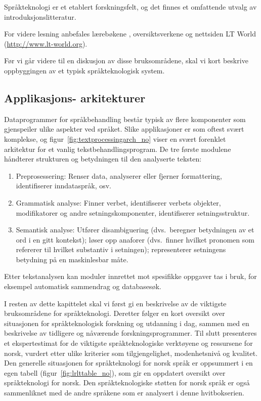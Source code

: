 \begin{multicols}{2}
Språkteknologi er et etablert forskningsfelt, og det finnes et omfattende utvalg av introduksjonslitteratur.

For videre lesning anbefales lærebøkene \cite{jurafsky-martin01, manning-schuetze1}, oversiktsverkene \cite{lt-survey1} og nettsiden LT World (\url{http://www.lt-world.org}).

Før vi går videre til en diskusjon av disse bruksområdene, skal vi kort beskrive oppbyggingen av et typisk språkteknologisk system.

\subsection[Applikasjonsarkitekturer]{Applikasjons- arkitekturer}

Dataprogrammer for språkbehandling består typisk av flere komponenter som gjenspeiler ulike aspekter ved språket. Slike applikasjoner er som oftest svært komplekse, og figur~\ref{fig:textprocessingarch_no} viser en svært forenklet arkitektur for et vanlig tekstbehandlingsprogram. De tre første modulene håndterer strukturen og betydningen til den analyserte teksten:

\begin{enumerate}
\item Preprosessering: Renser data, analyserer eller fjerner formattering, identifiserer  inndataspråk, osv.
\item Grammatisk analyse: Finner verbet, identifiserer verbets objekter, modifikatorer og andre setningskomponenter, identifiserer setningsstruktur.
\item Semantisk analyse: Utfører disambiguering (dvs.~beregner betydningen av et ord i en gitt kontekst); løser opp anaforer (dvs.~finner hvilket pronomen som refererer til hvilket substantiv i setningen); representerer setningens betydning på en maskinlesbar måte.
\end{enumerate}

Etter tekstanalysen kan moduler innrettet mot spesifikke oppgaver tas i bruk, for eksempel automatisk sammendrag og databasesøk. 

I resten av dette kapittelet skal vi først gi en beskrivelse av de viktigste bruksområdene for språkteknologi. Deretter følger en kort oversikt over situasjonen for språkteknologisk forskning og utdanning i dag, sammen med en beskrivelse av tidligere og nåværende forskningsprogrammer. Til slutt presenteres et ekspertestimat for de viktigste språkteknologiske verktøyene og ressursene for norsk, vurdert etter ulike kriterier som tilgjengelighet, modenhetsnivå og kvalitet. Den generelle situasjonen for språkteknologi for norsk språk er oppsummert i en egen tabell (figur~\ref{fig:lrlttable_no}), som gir en oppdatert oversikt over språkteknologi for norsk. Den språkteknologiske støtten for norsk språk er også sammenliknet med de andre språkene som er analysert i denne hvitbokserien.


\end{multicols}
